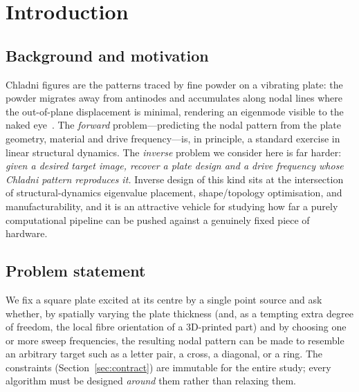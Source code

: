 \documentclass[11pt,a4paper]{article}
\begin{document}
\section{Introduction}

\subsection{Background and motivation}
Chladni figures are the patterns traced by fine powder on a vibrating plate: the
powder migrates away from antinodes and accumulates along nodal lines where the
out-of-plane displacement is minimal, rendering an eigenmode visible to the naked
eye~\cite{chladni1787,waller1939}. The \emph{forward} problem---predicting the
nodal pattern from the plate geometry, material and drive frequency---is, in
principle, a standard exercise in linear structural dynamics. The
\emph{inverse} problem we consider here is far harder: \emph{given a desired
target image, recover a plate design and a drive frequency whose Chladni pattern
reproduces it.} Inverse design of this kind sits at the intersection of
structural-dynamics eigenvalue placement, shape/topology optimisation, and
manufacturability, and it is an attractive vehicle for studying how far a purely
computational pipeline can be pushed against a genuinely fixed piece of
hardware.

\subsection{Problem statement}
We fix a square plate excited at its centre by a single point source and ask
whether, by spatially varying the plate thickness (and, as a tempting extra
degree of freedom, the local fibre orientation of a 3D-printed part) and by
choosing one or more sweep frequencies, the resulting nodal pattern can be made to
resemble an arbitrary target such as a letter pair, a cross, a diagonal, or a
ring. The constraints (Section~\ref{sec:contract}) are immutable for the entire
study; every algorithm must be designed \emph{around} them rather than relaxing
them.
\end{document}
